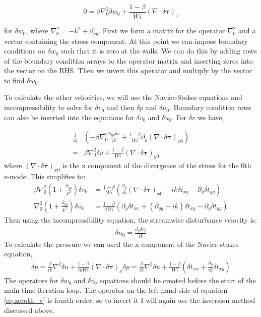 \documentclass[12pt,a4paper]{article}
\newcommand{\stxx}{\delta t_{xx}}
\newcommand{\styy}{\delta t_{yy}}
\newcommand{\stxy}{\delta t_{xy}}
\newcommand{\su}{\delta u}
\newcommand{\sv}{\delta v}
\newcommand{\sw}{\delta w}
\newcommand{\spr}{\delta p}
\newcommand{\dd}[1]{\partial_{#1}}
\begin{document}
\begin{equation}
    0 = \beta \nabla_{0}^{2} \sw_{0} + \frac{1-\beta}{Wi} \left( \nabla \cdot \delta \mathbf{\tau} \right)_{z}
\end{equation}

for $\sw_{0}$, where $\nabla_{0}^{2} = -k^{2} + \dd{yy}$. First we form a matrix for the operator $\nabla_{0}^{2}$ and a vector containing the stress component. At this point we can impose boundary conditions on $\sw_{0}$ such that it is zero at the walls. We can do this by adding rows of the boundary condition arrays to the operator matrix and inserting zeros into the vector on the RHS. Then we invert this operator and multiply by the vector to find $\sw_{0}$. 

To calculate the other velocities, we will use the Navier-Stokes equations and incompressibility to solve for $\sv_{0}$ and then $\spr$ and $\su_{0}$. Boundary condition rows can also be inserted into the equations for $\sv_{0}$ and $\su_{0}$. For $\sv$ we have,

\begin{align}
    \frac{1}{ik} & \left( - \beta \nabla_{0}^{2} \frac{\dd{yy} \sv}{ik} + \frac{1-\beta}{Wi} \dd{y} \left( \nabla \cdot \delta \mathbf{\tau} \right)_{x0} \right) \nonumber\\
    = & \beta \nabla_{0}^{2} \sv + \frac{1-\beta}{Wi}\left( \nabla \cdot \delta \mathbf{\tau} \right)_{y0} 
\end{align}
where $\left( \nabla \cdot \delta \mathbf{\tau} \right)_{x0}$ is the x component of the divergence of the stress for the 0th z-mode. This simplifies to:
\begin{align}
    \beta\nabla_{0}^{2}\left( 1+ \frac{\dd{yy}}{k^{2}} \right)\sv_{0} &= \frac{1-\beta}{Wi}\left( \frac{\dd{y}}{ik} \left( \nabla \cdot \delta \mathbf{\tau} \right)_{x0} - ik\stxy - \dd{y}\styy \right) \nonumber \\
    \nabla_{0}^{2}\left( 1+ \frac{\dd{yy}}{k^{2}} \right)\sv_{0} &= \frac{1-\beta}{\beta Wi}\left( \dd{y} \stxx + \left( \dd{yy} - ik \right) \stxy - \dd{y} \styy \right)
    \label{eq:zeroth_v}
\end{align}
Then using the incompressibility equation, the streamwise disturbance velocity is:
\begin{align}
    \su_{0} = \frac{\dd{y}\sv_{0}}{ik} 
\end{align}
To calculate the pressure we can used the x component of the Navier-stokes equation,
\begin{align}
    \spr = \frac{\beta}{ik}\nabla^{2}\su + \frac{1-\beta}{ikWi}\left( \nabla \cdot \delta \mathbf{\tau} \right)_{x}
    \spr =  \frac{\beta}{ik}\nabla^{2}\su + \frac{1-\beta}{Wi}\left( \stxx + \frac{\dd{y}}{ik}\stxy\right)
\end{align}
The operators for $\sw_{0}$ and $\sv_{0}$ equations should be created before the start of the main time iteration loop. The operator on the left-hand-side of equation \ref{eq:zeroth_v} is fourth order, so to invert it I will again use the inversion method discussed above.
\end{document}

